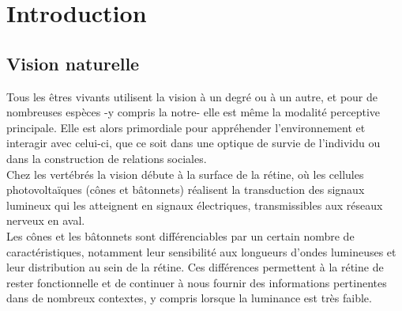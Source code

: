 
\chapter{Introduction} %
\label{Introduction} %


\newcommand{\keyword}[1]{\textbf{#1}}
\newcommand{\tabhead}[1]{\textbf{#1}}
\newcommand{\code}[1]{\texttt{#1}}
\newcommand{\file}[1]{\texttt{\bfseries#1}}
\newcommand{\option}[1]{\texttt{\itshape#1}}


\section{Vision naturelle}
Tous  les êtres vivants utilisent la vision à un degré ou à un autre, et pour de nombreuses espèces -y compris la notre- elle est même la modalité perceptive principale. Elle est alors primordiale pour appréhender l'environnement et interagir avec celui-ci, que ce soit dans une optique de survie de l'individu ou dans la construction de relations sociales.\autocite{Werner2014}\\

Chez les vertébrés la vision débute à la surface de la rétine, où les cellules photovoltaïques (cônes et bâtonnets) réalisent la transduction des signaux lumineux qui les atteignent en signaux électriques, transmissibles aux réseaux nerveux en aval.\autocite{Werner2014}\\
Les cônes et les bâtonnets sont différenciables par un certain nombre de caractéristiques, notamment leur sensibilité aux longueurs d'ondes lumineuses et leur distribution au sein de la rétine. Ces différences permettent à la rétine de rester fonctionnelle et de continuer à nous fournir des informations pertinentes dans de nombreux contextes, y compris lorsque la luminance est très faible.\autocite{Werner2014}\\


